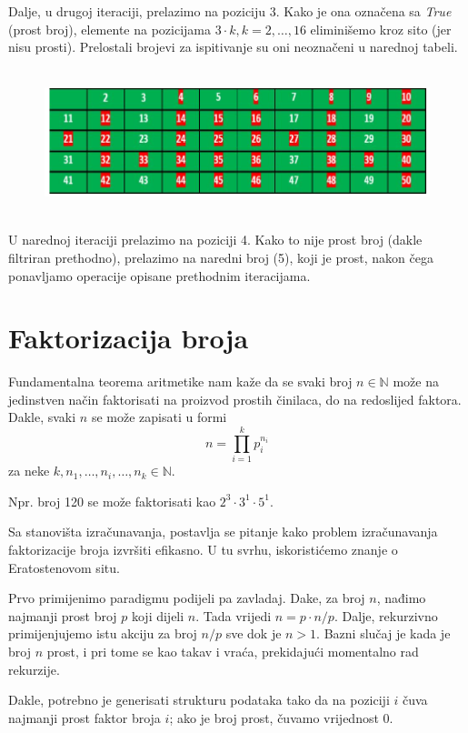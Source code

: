 Dalje, u drugoj iteraciji, prelazimo na poziciju 3. Kako je ona označena sa \emph{True} (prost broj), elemente na pozicijama $3\cdot k, k=2, \ldots, 16$ eliminišemo kroz sito (jer nisu prosti). Prelostali brojevi za ispitivanje su oni neoznačeni u narednoj tabeli. 

\begin{figure}[H]
	\centering
	\includegraphics[width=340pt,height=120pt]{slike/sieve-it-1.png}
\end{figure}

U narednoj iteraciji prelazimo na poziciji 4. Kako to nije prost broj (dakle filtriran prethodno), prelazimo na naredni broj (5), koji je prost, nakon čega ponavljamo operacije opisane prethodnim iteracijama. 

\section{Faktorizacija broja}

Fundamentalna teorema aritmetike nam kaže da se svaki broj $n \in \mathbb{N}$ može na jedinstven način faktorisati na proizvod prostih činilaca, do na redoslijed faktora. Dakle, svaki $n$ se može zapisati u formi
 $$n = \prod_{i=1}^k p_i^{n_i}$$
 za neke $k, n_1,\ldots, n_i, \ldots, n_k \in \mathbb{N}$.
 
 Npr. broj 120 se može faktorisati kao $2^3 \cdot 3^1 \cdot 5^1$.
 
 Sa stanovišta izračunavanja, postavlja se pitanje kako problem izračunavanja faktorizacije broja izvršiti efikasno.  U tu svrhu, iskoristićemo znanje o Eratostenovom situ. 
 
 Prvo primijenimo paradigmu podijeli pa zavladaj. Dake, za broj $n$, nađimo najmanji prost broj $p$ koji dijeli $n$. Tada vrijedi $n = p \cdot n/p$. Dalje, rekurzivno primijenjujemo istu akciju za broj $n/p$ sve dok je $n>1$. Bazni slučaj je kada je broj $n$ prost, i pri tome se kao takav i vraća, prekidajući momentalno rad rekurzije. 
 
 Dakle, potrebno je generisati strukturu podataka  tako da na poziciji $i$ čuva najmanji prost faktor broja $i$; ako je broj prost, čuvamo vrijednost 0.
 

